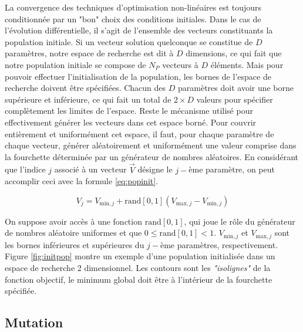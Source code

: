 La convergence des techniques d'optimisation non-linéaires est toujours conditionnée par un "bon" choix des conditions initiales. Dans le cas de l'évolution différentielle, il s'agit de l'ensemble des vecteurs constituants la population initiale. Si un vecteur solution quelconque se constitue de $D$ paramètres, notre espace de recherche est dit à $D$ dimensions, ce qui fait que notre population initiale se compose de $N_P$ vecteurs à $D$ éléments. Mais pour pouvoir effectuer l'initialisation de la population, les bornes de l'espace de recherche doivent être spécifiées. Chacun des $D$ paramètres doit avoir une borne supérieure et inférieure, ce qui fait un total de $2 \times D$ valeurs pour spécifier complètement les limites de l'espace. Reste le mécanisme utilisé pour effectivement générer les vecteurs dans cet espace borné. Pour couvrir entièrement et uniformément cet espace, il faut, pour chaque paramètre de chaque vecteur, générer aléatoirement et uniformément une valeur comprise dans la fourchette déterminée par un générateur de nombres aléatoires. En considérant que l'indice $j$ associé à un vecteur $\vec{V}$ désigne le $j-$ème paramètre, on peut accomplir ceci avec la formule \ref{eq:popinit}. 

\begin{equation}
  \label{eq:popinit}
  V_j = V_{\text{min},j} + \text{rand}[0, 1](V_{\text{max},j} - V_{\text{min},j})
\end{equation} 

On suppose avoir accès à une fonction $\text{rand}[0, 1]$, qui joue le rôle du générateur de nombres aléatoire uniformes et que $0 \leq \text{rand}[0, 1] < 1$. 
$V_{\text{min},j}$ et $V_{\text{max},j}$ sont les bornes inférieures   et supérieures du $j-$ème paramètres, respectivement. Figure \ref{fig:initpop} montre un exemple d'une population initialisée dans un espace de recherche 2 dimensionnel. Les contours sont les \textit{"isolignes"} de la fonction objectif, le minimum global doit être à l'intérieur de la fourchette spécifiée. 
\clearpage

\subsection{Mutation}

